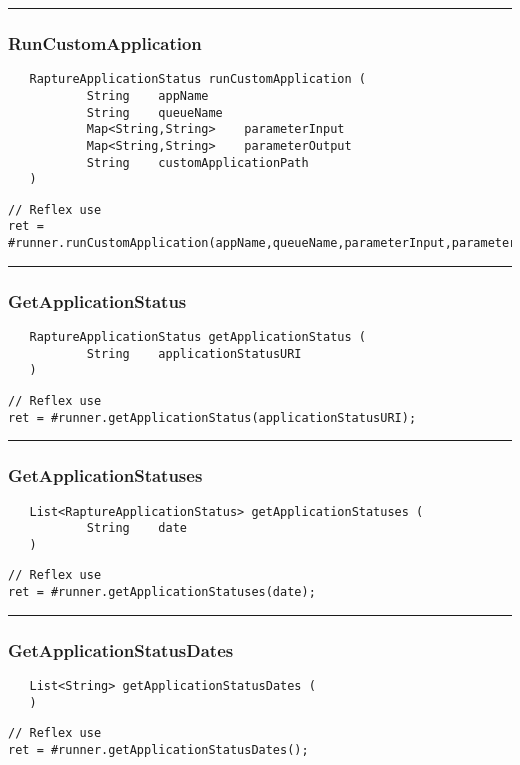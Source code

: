 \rule{15cm}{2pt}
\subsubsection{RunCustomApplication}
\label{Api:RunCustomApplication}
\begin{verbatim}
   RaptureApplicationStatus runCustomApplication (
           String    appName
           String    queueName
           Map<String,String>    parameterInput
           Map<String,String>    parameterOutput
           String    customApplicationPath
   )
\end{verbatim}
\begin{lstlisting}[language=reflex]
// Reflex use
ret = #runner.runCustomApplication(appName,queueName,parameterInput,parameterOutput,customApplicationPath);
\end{lstlisting}



\rule{15cm}{2pt}
\subsubsection{GetApplicationStatus}
\label{Api:GetApplicationStatus}
\begin{verbatim}
   RaptureApplicationStatus getApplicationStatus (
           String    applicationStatusURI
   )
\end{verbatim}
\begin{lstlisting}[language=reflex]
// Reflex use
ret = #runner.getApplicationStatus(applicationStatusURI);
\end{lstlisting}



\rule{15cm}{2pt}
\subsubsection{GetApplicationStatuses}
\label{Api:GetApplicationStatuses}
\begin{verbatim}
   List<RaptureApplicationStatus> getApplicationStatuses (
           String    date
   )
\end{verbatim}
\begin{lstlisting}[language=reflex]
// Reflex use
ret = #runner.getApplicationStatuses(date);
\end{lstlisting}



\rule{15cm}{2pt}
\subsubsection{GetApplicationStatusDates}
\label{Api:GetApplicationStatusDates}
\begin{verbatim}
   List<String> getApplicationStatusDates (
   )
\end{verbatim}
\begin{lstlisting}[language=reflex]
// Reflex use
ret = #runner.getApplicationStatusDates();
\end{lstlisting}



